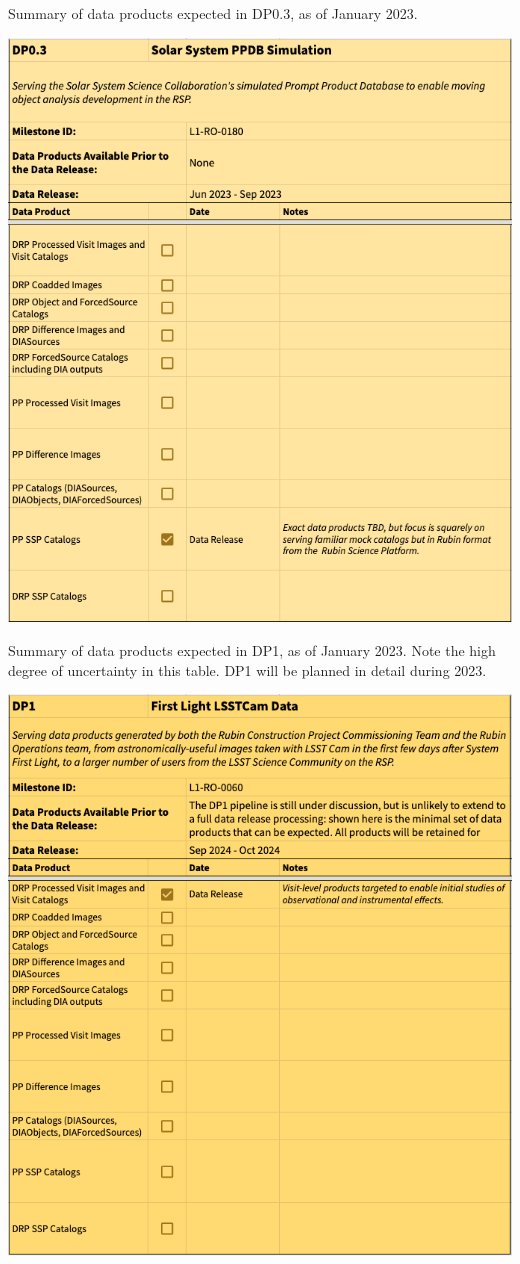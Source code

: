 \begin{table}[ht]
\centering
\label{tab:dp-zero-three-products}
\caption{Summary of data products expected in DP0.3, as of January 2023.}
\includegraphics[width=0.9\linewidth]{figures/DP0_3-products.png}
\end{table}

\begin{table}[ht]
\centering
\label{tab:dp-one-products}
\caption{Summary of data products expected in DP1, as of January 2023.
Note the high degree of uncertainty in this table. DP1 will be planned in detail during 2023.}
\includegraphics[width=0.9\linewidth]{figures/DP1-products}
\end{table}

